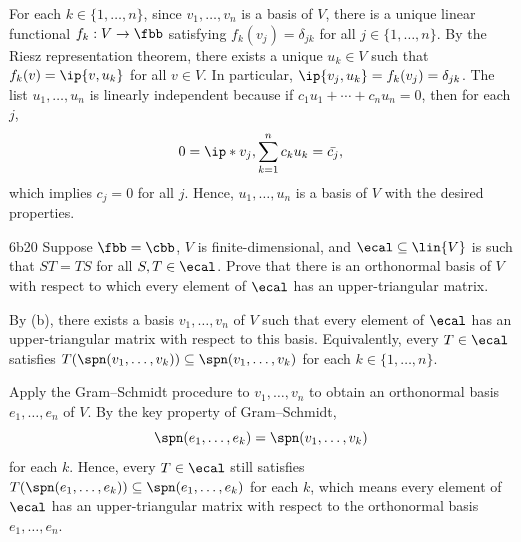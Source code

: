 \begin{sol}
    For each $k \in \{1, \ldots, n\}$, since $v_1, \ldots, v_n$ is a basis of $V$, there is a unique linear functional $f_k : V \to \fbb$ satisfying $f_k(v_j) = \delta_{jk}$ for all $j \in \{1, \ldots, n\}$.
    By the Riesz representation theorem, there exists a unique $u_k \in V$ such that $f_k(v) = \ip{v, u_k}$ for all $v \in V$.
    In particular, $\ip{v_j, u_k} = f_k(v_j) = \delta_{jk}$.
    The list $u_1, \ldots, u_n$ is linearly independent because if $c_1 u_1 + \cdots + c_n u_n = 0$, then for each $j$,
    \[
        0 = \ip*{v_j, \sum_{k=1}^{n} c_k u_k} = \bar{c_j},
    \]
    which implies $c_j = 0$ for all $j$.
    Hence, $u_1, \ldots, u_n$ is a basis of $V$ with the desired properties.
\end{sol}

\begin{exercise}{6b20}
    Suppose $\fbb = \cbb$, $V$ is finite-dimensional, and $\ecal \subseteq \lin{V}$ is such that $ST = TS$ for all $S, T \in \ecal$.
    Prove that there is an orthonormal basis of $V$ with respect to which every element of $\ecal$ has an upper-triangular matrix.

\end{exercise}

\begin{sol}
    By (b), there exists a basis $v_1, \ldots, v_n$ of $V$ such that every element of $\ecal$ has an upper-triangular matrix with respect to this basis.
    Equivalently, every $T \in \ecal$ satisfies $T(\spn(v_1, \ldots, v_k)) \subseteq \spn(v_1, \ldots, v_k)$ for each $k \in \{1, \ldots, n\}$.

    Apply the Gram--Schmidt procedure to $v_1, \ldots, v_n$ to obtain an orthonormal basis $e_1, \ldots, e_n$ of $V$.
    By the key property of Gram--Schmidt,
    \[
        \spn(e_1, \ldots, e_k) = \spn(v_1, \ldots, v_k)
    \]
    for each $k$.
    Hence, every $T \in \ecal$ still satisfies $T(\spn(e_1, \ldots, e_k)) \subseteq \spn(e_1, \ldots, e_k)$ for each $k$, which means every element of $\ecal$ has an upper-triangular matrix with respect to the orthonormal basis $e_1, \ldots, e_n$.
\end{sol}

